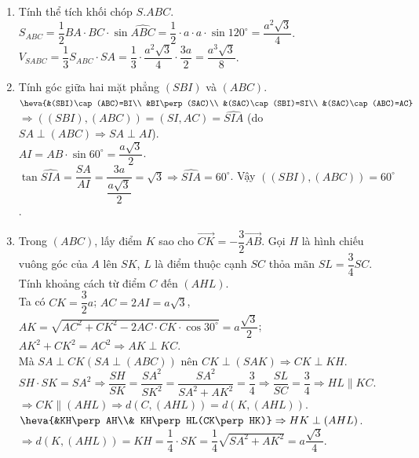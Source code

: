 \begin{bt}
{\begin{enumerate}
			Tam giác $ABC$ cân tại $B$ có $I$ là trung điểm của $AC$ $\Rightarrow BI\perp AC\quad(1)$\\
			$SA\perp(ABC)\Rightarrow BI\perp SA\quad(2)$\\
			Từ $(1)$ và $(2)$ suy ra $BI\perp(SAC)$.
			\item Tính thể tích khối chóp $S.ABC$.\\
			$S_{ABC}=\dfrac{1}{2}BA\cdot BC\cdot\sin\widehat{ABC}=\dfrac{1}{2}\cdot a\cdot a\cdot\sin 120^{\circ}=\dfrac{a^2\sqrt{3}}{4}$.\\
			$V_{SABC}=\dfrac{1}{3} S_{ABC}\cdot SA=\dfrac{1}{3}\cdot\dfrac{a^2\sqrt{3}}{4}\cdot\dfrac{3a}{2}=\dfrac{a^3\sqrt{3}}{8}$.
			\item Tính góc giữa hai mặt phẳng $(SBI)$ và $(ABC)$.\\
			$\heva{&(SBI)\cap(ABC)=BI\\
				&BI\perp(SAC)\\
				&(SAC)\cap(SBI)=SI\\
				&(SAC)\cap(ABC)=AC}$\\
			$\Rightarrow((SBI),(ABC)) =(SI,AC)=\widehat{SIA}$ (do $SA\perp(ABC)\Rightarrow SA\perp AI$).\\
			$AI=AB\cdot\sin 60^{\circ}=\dfrac{a\sqrt{3}}{2}$.\\
			$\tan\widehat{SIA}=\dfrac{SA}{AI}=\dfrac{3a}{\dfrac{a\sqrt{3}}{2}}=\sqrt{3}\Rightarrow\widehat{SIA}=60^{\circ}$. 
			Vậy $\left((SBI),(ABC)\right)=60^{\circ}$.
			\item Trong $(ABC)$, lấy điểm $K$ sao cho $\overrightarrow{CK}=-\dfrac{3}{2}\overrightarrow{AB}$. Gọi $H$ là hình chiếu vuông góc của $A$ lên $SK$, $L$ là điểm thuộc cạnh $SC$ thỏa mãn $SL=\dfrac{3}{4}SC$. Tính khoảng cách từ điểm $C$ đến $(AHL)$.\\
			Ta có
			$CK=\dfrac{3}{2}a$; $AC=2AI=a\sqrt{3}$, $AK=\sqrt{AC^2+CK^2 - 2AC\cdot CK\cdot\cos 30^\circ}=a\dfrac{\sqrt{3}}{2}$;\\
			$AK^2+CK^2=AC^2\Rightarrow AK\perp KC$.\\
			Mà  $SA\perp CK(SA\perp(ABC)) $ nên $ CK\perp(SAK)\Rightarrow CK\perp KH$.\\
			$SH\cdot SK=SA^2\Rightarrow\dfrac{SH}{SK}=\dfrac{SA^2}{SK^2}=\dfrac{SA^2}{SA^2+AK^2}=\dfrac{3}{4}\Rightarrow\dfrac{SL}{SC}=\dfrac{3}{4}\Rightarrow HL\parallel KC$.\\
			$\Rightarrow CK\parallel(AHL)\Rightarrow d(C,(AHL))=d(K,(AHL))$.\\
			$\heva{&KH\perp AH\\& KH\perp HL(CK\perp HK)}\Rightarrow HK\perp(AHL)$.\\
			$\Rightarrow d(K,(AHL))=KH=\dfrac{1}{4}\cdot SK=\dfrac{1}{4}\sqrt{SA^2+AK^2}=a\dfrac{\sqrt{3}}{4}$.\\
		\end{enumerate}}
	\end{bt}

